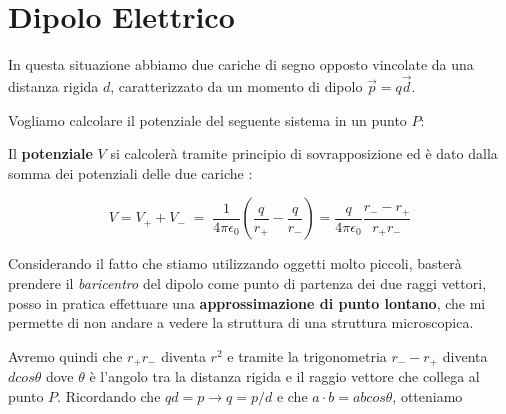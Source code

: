 \section{Dipolo Elettrico}
In questa situazione abbiamo due cariche di segno opposto vincolate da una distanza rigida $d$, caratterizzato da un momento di dipolo $\vec{p} = q\vec{d}$. 

Vogliamo calcolare il potenziale del seguente sistema in un punto $P$: 

\begin{figure}[H]
	\centering
\end{figure}


Il \textbf{potenziale} $V$ si calcolerà tramite principio di sovrapposizione ed è dato dalla somma dei potenziali delle due cariche : 

$$
V = V_+ + V_-  \; = \;  \frac{1}{4\pi\epsilon_0} \left(\frac{q}{r_+} - \frac{q}{r_-}\right) = \frac{q}{4\pi\epsilon_0} \frac{r_- - r_+}{r_+r_-}
$$

Considerando il fatto che stiamo utilizzando oggetti molto piccoli, basterà prendere il \textit{baricentro} del dipolo come punto di partenza dei due raggi vettori, posso in pratica effettuare una \textbf{approssimazione di punto lontano}, che mi permette di non andare a vedere la struttura di una struttura microscopica. 

Avremo quindi che $r_+r_-$ diventa $r^2$ e tramite la trigonometria $r_- - r_+$ diventa $dcos\theta$ dove $\theta$ è l'angolo tra la distanza rigida e il raggio vettore che collega al punto $P$.  
Ricordando che $qd = p \rightarrow q = p/d$ e che $a \cdot b = abcos\theta$, otteniamo

